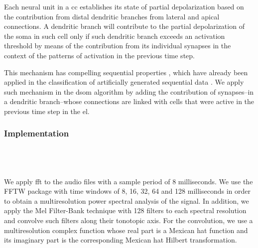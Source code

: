 \documentclass[10pt,letterpaper]{article}
\begin{document}
Each neural unit in a \gls{cc} establishes its state of partial depolarization based on the contribution from
distal dendritic branches from lateral and apical connections.
A dendritic branch will contribute to the partial depolarization of the soma in such cell only if such
dendritic branch exceeds an activation threshold by means of the contribution from its individual synapses
in the context of the patterns of activation in the previous time step.

This mechanism has compelling sequential properties \cite{hawkins_2016},
which have already been applied in the classification of artificially generated sequential data \cite{cui_2016}.
We apply such mechanism in the \gls{dsom} algorithm by adding the contribution of synapses--in a dendritic branch--whose connections
are linked with cells that were active in the previous time step in the \gls{el}.
















\subsubsection*{Implementation}
\label{model-implementation}


~\\
~\\
~\\

We apply \gls{fft} to the audio files with a sample period of 8 milliseconds.
We use the FFTW package \cite{FFTW05, fftw}
with time windows of 8, 16, 32, 64 and 128 milliseconds in order to obtain
a multiresolution power spectral analysis of the signal.
In addition, we apply the Mel Filter-Bank technique with 128 filters to each
spectral resolution and convolve such filters along their tonotopic axis.
For the convolution, we use a multiresolution complex function whose real part
is a Mexican hat function and its imaginary part is the corresponding Mexican hat Hilbert transformation.

\end{document}
